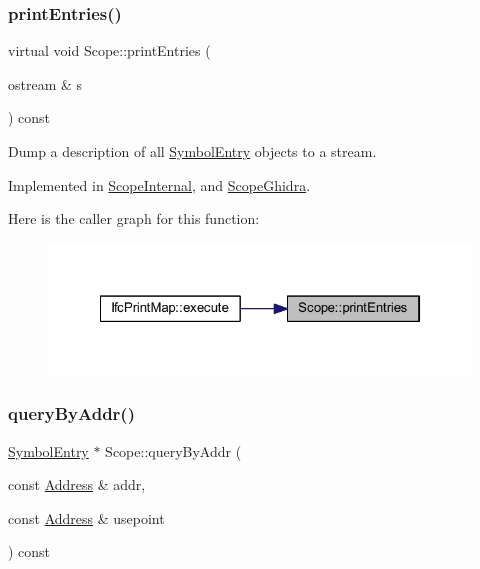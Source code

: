 \subsubsection{\texorpdfstring{printEntries()}{printEntries()}}
{\footnotesize\ttfamily virtual void Scope\+::print\+Entries (\begin{DoxyParamCaption}\item[{ostream \&}]{s }\end{DoxyParamCaption}) const\hspace{0.3cm}{\ttfamily [pure virtual]}}



Dump a description of all \mbox{\hyperlink{class_symbol_entry}{Symbol\+Entry}} objects to a stream. 



Implemented in \mbox{\hyperlink{class_scope_internal_aac820e63b0d1739b9f14e15898fc9a9e}{Scope\+Internal}}, and \mbox{\hyperlink{class_scope_ghidra_a6d3865ed7c8917f5f1594f4dd63ade7a}{Scope\+Ghidra}}.

Here is the caller graph for this function\+:
\nopagebreak
\begin{figure}[H]
\begin{center}
\leavevmode
\includegraphics[width=322pt]{class_scope_a7d67a1b9e60078023b508dd3cbe4447d_icgraph}
\end{center}
\end{figure}
\mbox{\label{class_scope_afc95566b073624a0d12231a8e70bc5ce}} 
\subsubsection{\texorpdfstring{queryByAddr()}{queryByAddr()}}
{\footnotesize\ttfamily \mbox{\hyperlink{class_symbol_entry}{Symbol\+Entry}} $\ast$ Scope\+::query\+By\+Addr (\begin{DoxyParamCaption}\item[{const \mbox{\hyperlink{class_address}{Address}} \&}]{addr,  }\item[{const \mbox{\hyperlink{class_address}{Address}} \&}]{usepoint }\end{DoxyParamCaption}) const}



